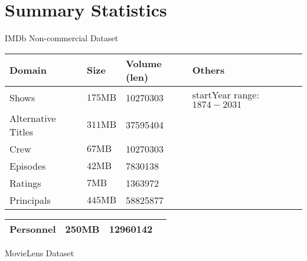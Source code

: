 \documentclass[10pt,titlepage]{article}
\begin{document}
\section{Summary Statistics}
IMDb Non-commercial Dataset

\begin{center}
\begin{tabular}{|l|l|l|l|}
\hline
Domain & Size & Volume (len) & Others \\
\hline
Shows & $175 \mathrm{MB}$ & 10270303 & startYear range: $1874-2031$ \\
\hline
Alternative Titles & $311 \mathrm{MB}$ & 37595404 &  \\
\hline
Crew & $67 \mathrm{MB}$ & 10270303 &  \\
\hline
Episodes & $42 \mathrm{MB}$ & 7830138 &  \\
\hline
Ratings & $7 \mathrm{MB}$ & 1363972 &  \\
\hline
Principals & $445 \mathrm{MB}$ & 58825877 &  \\
\hline
\end{tabular}
\end{center}

\begin{center}
\begin{tabular}{|l|l|l|l|}
\hline
Personnel & 250MB & 12960142 &  \\
\hline
\end{tabular}
\end{center}

MovieLens Dataset
\end{document}
